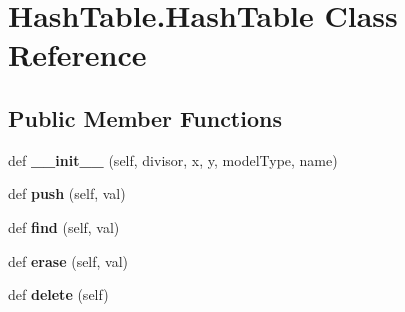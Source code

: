 \hypertarget{class_hash_table_1_1_hash_table}{}\section{Hash\+Table.\+Hash\+Table Class Reference}
\label{class_hash_table_1_1_hash_table}
\subsection*{Public Member Functions}
\begin{DoxyCompactItemize}
\item 
\mbox{\label{class_hash_table_1_1_hash_table_a775b63cd65429a5c9cfa386c570ff211}} 
def {\bfseries \+\_\+\+\_\+init\+\_\+\+\_\+} (self, divisor, x, y, model\+Type, name)
\item 
\mbox{\label{class_hash_table_1_1_hash_table_a7339efb6b22404d54bbea45484a2c908}} 
def {\bfseries push} (self, val)
\item 
\mbox{\label{class_hash_table_1_1_hash_table_a6d4d5b9daeebd3376cba8a52ab3e2704}} 
def {\bfseries find} (self, val)
\item 
\mbox{\label{class_hash_table_1_1_hash_table_a33972a0c632fec72ff9880a1b910a141}} 
def {\bfseries erase} (self, val)
\item 
\mbox{\label{class_hash_table_1_1_hash_table_abf67330f9837015cd00429eb6909f02b}} 
def {\bfseries delete} (self)
\end{DoxyCompactItemize}
